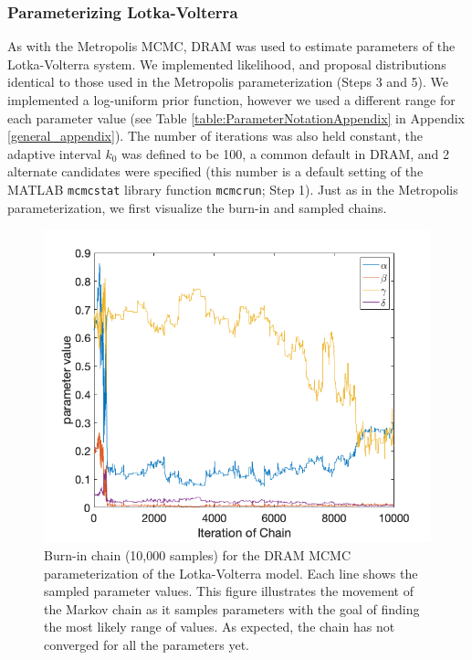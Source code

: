 \subsubsection{Parameterizing Lotka-Volterra}
As with the Metropolis MCMC, DRAM was used to estimate parameters of the Lotka-Volterra system. We implemented likelihood, and proposal distributions identical to those used in the Metropolis parameterization (Steps 3 and 5). We implemented a log-uniform prior function, however we used a different range for each parameter value (see Table \ref{table:ParameterNotationAppendix} in Appendix \ref{general_appendix}). The number of iterations was also held constant, the adaptive interval $k_0$ was defined to be 100, a common default in DRAM, and 2 alternate candidates were specified (this number is a default setting of the MATLAB \texttt{mcmcstat} library function \texttt{mcmcrun}; Step 1). Just as in the Metropolis parameterization, we first visualize the burn-in and sampled chains.
\begin{figure}[H]
    \centering
    \includegraphics[width=15cm]{MCMC_figs/met_lv_final/final_dram_burninchain.png}
    \caption{Burn-in chain (10,000 samples) for the DRAM MCMC parameterization of the Lotka-Volterra model. Each line shows the sampled parameter values. This figure illustrates the movement of the Markov chain as it samples parameters with the goal of finding the most likely range of values. As expected, the chain has not converged for all the parameters yet.}
    \label{fig:6mcmc} 
\end{figure}
